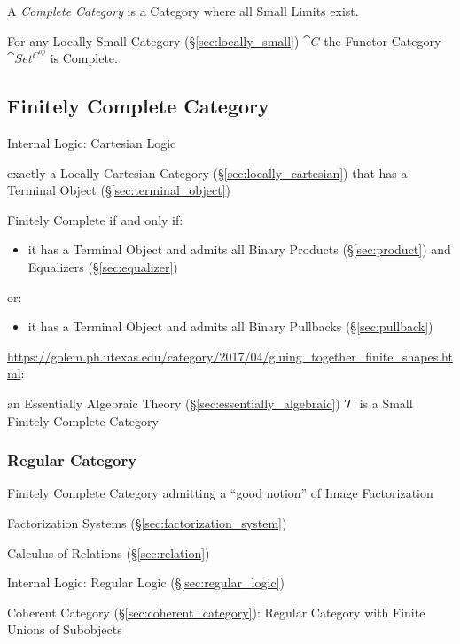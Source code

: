 A \emph{Complete Category} is a Category where all Small Limits exist.

For any Locally Small Category (\S\ref{sec:locally_small})
$\cat{C}$ the Functor Category $\cat{Set^{C^{op}}}$ is Complete.



\subsection{Finitely Complete Category}\label{sec:finitely_complete}

Internal Logic: Cartesian Logic %

exactly a Locally Cartesian Category (\S\ref{sec:locally_cartesian})
that has a Terminal Object (\S\ref{sec:terminal_object})

Finitely Complete if and only if:
\begin{itemize}
  \item it has a Terminal Object and admits all Binary Products
    (\S\ref{sec:product}) and Equalizers (\S\ref{sec:equalizer})
\end{itemize}
or:
\begin{itemize}
  \item it has a Terminal Object and admits all Binary Pullbacks
    (\S\ref{sec:pullback})
\end{itemize}

\url{https://golem.ph.utexas.edu/category/2017/04/gluing_together_finite_shapes.html}:

an Essentially Algebraic Theory (\S\ref{sec:essentially_algebraic})
$\mathcal{T}$ is a Small Finitely Complete Category



\subsubsection{Regular Category}\label{sec:regular_category}

Finitely Complete Category admitting a ``good notion'' of Image
Factorization

\fist Factorization Systems (\S\ref{sec:factorization_system})

Calculus of Relations (\S\ref{sec:relation})

Internal Logic: Regular Logic (\S\ref{sec:regular_logic})

Coherent Category (\S\ref{sec:coherent_category}): Regular Category
with Finite Unions of Subobjects

